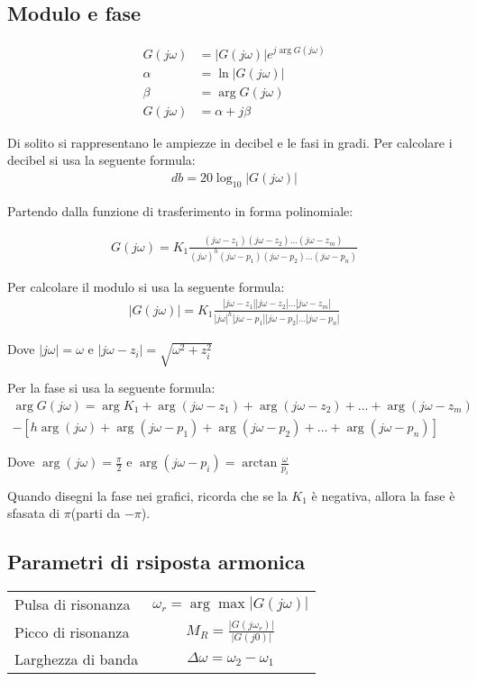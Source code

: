 \subsection{Modulo e fase}
\begin{align}
  G(j\omega) &= |G(j\omega)|e^{j \arg G(j\omega)} \\
  \alpha &= \ln |G(j\omega)| \\
  \beta &= \arg G(j\omega) \\
  G(j\omega) &= \alpha + j\beta
\end{align}


Di solito si rappresentano le ampiezze in decibel e le fasi in gradi. 
Per calcolare i decibel si usa la seguente formula:
\begin{align}
  db = 20 \log_{10} |G(j\omega)|
\end{align}


Partendo dalla funzione di trasferimento in forma polinomiale:

\begin{align}
  G(j\omega) = K_1 \frac{(j\omega-z_1)(j\omega-z_2)\dots(j\omega-z_m)}{(j\omega)^h(j\omega-p_1)(j\omega-p_2)\dots(j\omega-p_n)}
\end{align}

Per calcolare il modulo si usa la seguente formula:
\begin{align}
  |G(j\omega)| = K_1 \frac{|j\omega-z_1||j\omega-z_2|\dots|j\omega-z_m|}{|j\omega|^h|j\omega-p_1||j\omega-p_2|\dots|j\omega-p_n|}
\end{align}

Dove $|j\omega| = \omega$ e $|j\omega-z_i| = \sqrt{\omega^2 + z_i^2}$

Per la fase si usa la seguente formula:
\begin{align}
  \arg G(j\omega) = \arg K_1 + \arg (j\omega-z_1) + \arg (j\omega-z_2) + \dots + \arg (j\omega-z_m)  \\ 
  - [h\arg (j\omega) + \arg (j\omega-p_1) + \arg (j\omega-p_2) + \dots + \arg (j\omega-p_n)]
\end{align}

Dove $\arg (j\omega) = \frac{\pi}{2}$ e $\arg (j\omega-p_i) = \arctan \frac{\omega}{p_i}$

Quando disegni la fase nei grafici, ricorda che se la $K_1$ è negativa, allora la fase è sfasata di $\pi$(parti da $-\pi$).


\subsection{Parametri di rsiposta armonica}
\begin{center}
  \renewcommand{\arraystretch}{1.5}
  \begin{tabular}{|l|c|}
    \hline
    Pulsa di risonanza & $\omega_r = \arg \max |G(j\omega)|$ \\
    Picco di risonanza & $M_R = \frac{|G(j\omega_r)|}{|G(j0)|}$ \\
    Larghezza di banda & $\Delta \omega = \omega_2 - \omega_1$ \\
    \hline
  \end{tabular}
\end{center}
